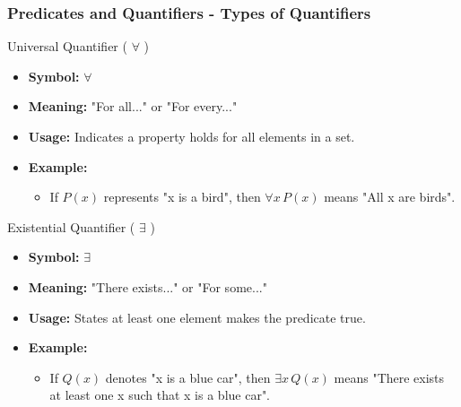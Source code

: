 \documentclass[aspectratio=169]{beamer}
\begin{document}
\begin{frame}[fragile]
    \frametitle{Predicates and Quantifiers - Types of Quantifiers}
    \begin{block}{Universal Quantifier ( \( \forall \) )}
        \begin{itemize}
            \item \textbf{Symbol:} \( \forall \)
            \item \textbf{Meaning:} "For all..." or "For every..."
            \item \textbf{Usage:} Indicates a property holds for all elements in a set.
            \item \textbf{Example:} 
              \begin{itemize}
                  \item If \( P(x) \) represents "x is a bird", then \( \forall x \, P(x) \) means "All x are birds".
              \end{itemize}
        \end{itemize}
    \end{block}

    \begin{block}{Existential Quantifier ( \( \exists \) )}
        \begin{itemize}
            \item \textbf{Symbol:} \( \exists \)
            \item \textbf{Meaning:} "There exists..." or "For some..."
            \item \textbf{Usage:} States at least one element makes the predicate true.
            \item \textbf{Example:} 
              \begin{itemize}
                  \item If \( Q(x) \) denotes "x is a blue car", then \( \exists x \, Q(x) \) means "There exists at least one x such that x is a blue car".
              \end{itemize}
        \end{itemize}
    \end{block}
\end{frame}
\end{document}
